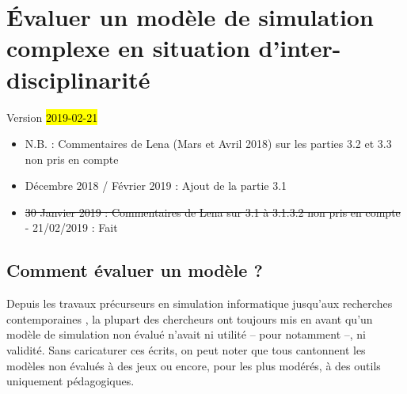 \chapter{Évaluer un modèle de simulation complexe en situation d'inter-disciplinarité}
\label{chap:chap3}
\begin{center}
{\large Version \hl{2019-02-21}}
\end{center}
\begin{itemize}
	\item N.B. : Commentaires de Lena (Mars et Avril 2018) sur les parties 3.2 et 3.3 non pris en compte
	\item Décembre 2018 / Février 2019 : Ajout de la partie 3.1
	\item \st{30 Janvier 2019 : Commentaires de Lena sur 3.1 à 3.1.3.2 non pris en compte} - 21/02/2019 : Fait
\end{itemize}


\minitoc

\clearpage



\section{Comment évaluer un modèle ?}\label{sec:evaluer-modele}

Depuis les travaux précurseurs en simulation informatique \autocite{naylor_verification_1967,hermann_validation_1967,sargent_validation_1979} jusqu'aux recherches contemporaines \autocite{amblard_evaluation_2006,banos_pour_2013,augusiak_merging_2014, rey-coyrehourcq_plateforme_2015}, la plupart des chercheurs ont toujours mis en avant qu'un modèle de simulation non évalué n'avait ni utilité -- pour \cite{naylor_verification_1967} notamment --, ni validité.
Sans caricaturer ces écrits, on peut noter que tous cantonnent les modèles non évalués à des \og jeux\fg{} ou encore, pour les plus modérés, à des outils uniquement pédagogiques.

